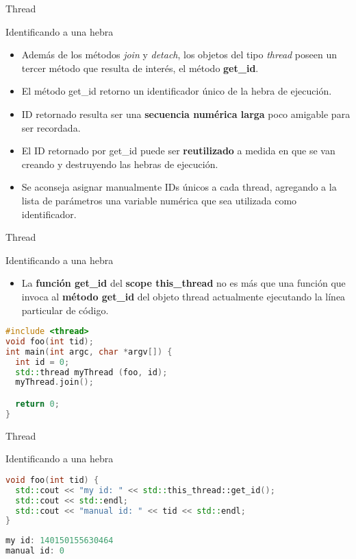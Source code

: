\begin{frame}{Thread}
\begin{block}{Identificando a una hebra}
\begin{itemize}
  \item Además de los métodos \textit{join} y \textit{detach}, los objetos del tipo \textit{thread} poseen un tercer método que resulta de interés, el método \textbf{get\_id}.
  \item El método get\_id retorno un identificador único de la hebra de ejecución.
  \item ID retornado resulta ser una \textbf{secuencia numérica larga} poco amigable para ser recordada.
  \item El ID retornado por get\_id puede ser \textbf{reutilizado} a medida en que se van creando y destruyendo las hebras de ejecución.
  \item Se aconseja asignar manualmente IDs únicos a cada thread, agregando a la lista de parámetros una variable numérica que sea utilizada como identificador.
\end{itemize}
\end{block}
\end{frame}

\begin{frame}[fragile]{Thread}
\begin{block}{Identificando a una hebra}
\begin{itemize}
  \item La \textbf{función get\_id} del \textbf{scope this\_thread} no es más que una función que invoca al \textbf{método get\_id} del objeto thread actualmente ejecutando la línea particular de código.
\end{itemize}
\begin{lstlisting}[language=C++, basicstyle=\small]
#include <thread>
void foo(int tid);
int main(int argc, char *argv[]) {
  int id = 0;
  std::thread myThread (foo, id);
  myThread.join();

  return 0;
}
\end{lstlisting}
\end{block}
\end{frame}

\begin{frame}[fragile]{Thread}
\begin{block}{Identificando a una hebra}
\begin{lstlisting}[language=C++, basicstyle=\small]
void foo(int tid) {
  std::cout << "my id: " << std::this_thread::get_id();
  std::cout << std::endl;
  std::cout << "manual id: " << tid << std::endl;
}
\end{lstlisting}
\begin{lstlisting}[language=C++, caption={output}, basicstyle=\small]
my id: 140150155630464
manual id: 0
\end{lstlisting}
\end{block}
\end{frame}

